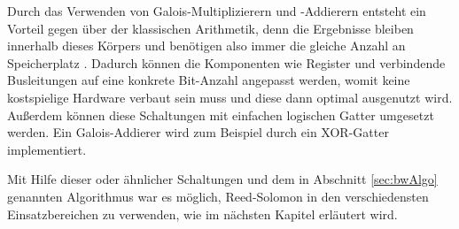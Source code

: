 Durch das Verwenden von Galois-Multiplizierern und -Addierern entsteht ein Vorteil gegen über der klassischen Arithmetik, denn die Ergebnisse bleiben innerhalb dieses Körpers und benötigen also immer die gleiche Anzahl an Speicherplatz \cite{weitzKonkreteMathematikNicht2021}.
Dadurch können die Komponenten wie Register und verbindende Busleitungen auf eine konkrete Bit-Anzahl angepasst werden, womit keine kostspielige Hardware verbaut sein muss und diese dann optimal ausgenutzt wird.
Außerdem können diese Schaltungen mit einfachen logischen Gatter umgesetzt werden.
Ein Galois-Addierer wird zum Beispiel durch ein XOR-Gatter implementiert.

Mit Hilfe dieser oder ähnlicher Schaltungen und dem in Abschnitt \ref{sec:bwAlgo} genannten Algorithmus war es möglich, Reed-Solomon in den verschiedensten Einsatzbereichen zu verwenden, wie im nächsten Kapitel erläutert wird.